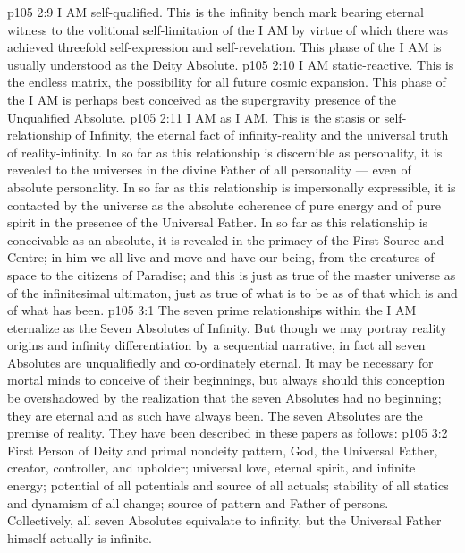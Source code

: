 \vs p105 2:9 \bibnobreakspace {} I AM self\hyp{}qualified. This is the infinity bench mark bearing eternal witness to the volitional self\hyp{}limitation of the I AM by virtue of which there was achieved threefold self\hyp{}expression and self\hyp{}revelation. This phase of the I AM is usually understood as the Deity Absolute.
\vs p105 2:10 \bibnobreakspace {} I AM static\hyp{}reactive. This is the endless matrix, the possibility for all future cosmic expansion. This phase of the I AM is perhaps best conceived as the supergravity presence of the Unqualified Absolute.
\vs p105 2:11 \bibnobreakspace {} I AM as I AM. This is the stasis or self\hyp{}relationship of Infinity, the eternal fact of infinity\hyp{}reality and the universal truth of reality\hyp{}infinity. In so far as this relationship is discernible as personality, it is revealed to the universes in the divine Father of all personality --- even of absolute personality. In so far as this relationship is impersonally expressible, it is contacted by the universe as the absolute coherence of pure energy and of pure spirit in the presence of the Universal Father. In so far as this relationship is conceivable as an absolute, it is revealed in the primacy of the First Source and Centre; in him we all live and move and have our being, from the creatures of space to the citizens of Paradise; and this is just as true of the master universe as of the infinitesimal ultimaton, just as true of what is to be as of that which is and of what has been.
\vs p105 3:1 The seven prime relationships within the I AM eternalize as the Seven Absolutes of Infinity. But though we may portray reality origins and infinity differentiation by a sequential narrative, in fact all seven Absolutes are unqualifiedly and co\hyp{}ordinately eternal. It may be necessary for mortal minds to conceive of their beginnings, but always should this conception be overshadowed by the realization that the seven Absolutes had no beginning; they are eternal and as such have always been. The seven Absolutes are the premise of reality. They have been described in these papers as follows:
\vs p105 3:2 \bibnobreakspace {} First Person of Deity and primal nondeity pattern, God, the Universal Father, creator, controller, and upholder; universal love, eternal spirit, and infinite energy; potential of all potentials and source of all actuals; stability of all statics and dynamism of all change; source of pattern and Father of persons. Collectively, all seven Absolutes equivalate to infinity, but the Universal Father himself actually is infinite.
